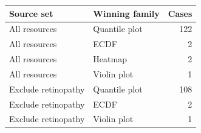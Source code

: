 \begin{center}\begin{tabular}{llr}\toprule
Source set & Winning family & Cases\\\midrule
All resources & Quantile plot & 122\\
All resources & ECDF & 2\\
All resources & Heatmap & 2\\
All resources & Violin plot & 1\\
Exclude retinopathy & Quantile plot & 108\\
Exclude retinopathy & ECDF & 2\\
Exclude retinopathy & Violin plot & 1\\
\bottomrule\end{tabular}\end{center}
